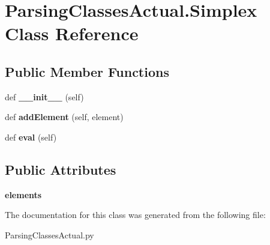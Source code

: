 \hypertarget{class_parsing_classes_actual_1_1_simplex}{}\section{Parsing\+Classes\+Actual.\+Simplex Class Reference}
\label{class_parsing_classes_actual_1_1_simplex}
\subsection*{Public Member Functions}
\begin{DoxyCompactItemize}
\item 
\mbox{\label{class_parsing_classes_actual_1_1_simplex_a4f09c613fb672e206b532b5abb96576e}} 
def {\bfseries \+\_\+\+\_\+init\+\_\+\+\_\+} (self)
\item 
\mbox{\label{class_parsing_classes_actual_1_1_simplex_a5c2423d5d737475748de577076863d57}} 
def {\bfseries add\+Element} (self, element)
\item 
\mbox{\label{class_parsing_classes_actual_1_1_simplex_a5955c7802478a8ed5e31a0264a32ac41}} 
def {\bfseries eval} (self)
\end{DoxyCompactItemize}
\subsection*{Public Attributes}
\begin{DoxyCompactItemize}
\item 
\mbox{\label{class_parsing_classes_actual_1_1_simplex_ae4c51bf50905e135df64c996c63b1247}} 
{\bfseries elements}
\end{DoxyCompactItemize}


The documentation for this class was generated from the following file\+:\begin{DoxyCompactItemize}
\item 
Parsing\+Classes\+Actual.\+py\end{DoxyCompactItemize}
